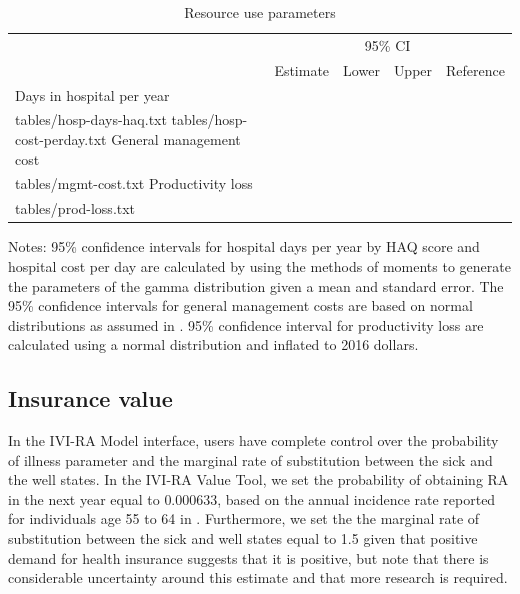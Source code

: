 \documentclass[11pt,final,fleqn]{article}
\makeatletter
\theoremstyle{plain}
\newcommand*\ExpandableInput[1]{\@@input#1 }
\makeatother
\begin{document}
\begin{table}[H]
\begin{center}
\begin{threeparttable}
\caption{Resource use parameters} \label{tbl:resource-use-pars}
\footnotesize
\begin{tabularx}{\textwidth}{@{\extracolsep{\fill}}lcccc}
\hline
\multicolumn{2}{l}{} & \multicolumn{2}{c}{95\% CI} & \multicolumn{1}{l}{} \\
\cmidrule{3-4} 
\multicolumn{1}{l}{} & \multicolumn{1}{l}{Estimate} & \multicolumn{1}{c}{Lower} & \multicolumn{1}{c}{Upper} & \multicolumn{1}{c}{Reference} \\
\hline
Days in hospital per year \\
\ExpandableInput{tables/hosp-days-haq.txt}
\ExpandableInput{tables/hosp-cost-perday.txt}
General management cost \\
\ExpandableInput{tables/mgmt-cost.txt}
Productivity loss \\
\ExpandableInput{tables/prod-loss.txt}
\hline
\end{tabularx}
\scriptsize
Notes: 95\% confidence intervals for hospital days per year by HAQ score and hospital cost per day are calculated by using the methods of moments to generate the parameters of the gamma distribution given a mean and standard error. The 95\% confidence intervals for general management costs are based on normal distributions as assumed in \citet{claxton2016economic}. 95\% confidence interval for productivity loss are calculated using a normal distribution and inflated to 2016 dollars. 
\end{threeparttable}
\end{center}
\end{table}

\subsection{Insurance value}
In the IVI-RA Model interface, users have complete control over the probability of illness parameter and the marginal rate of substitution between the sick and the well states. In the IVI-RA Value Tool, we set the probability of obtaining RA in the next year equal to $0.000633$, based on the annual incidence rate reported for individuals age 55 to 64 in \citet{myasoedova2010incidence}. Furthermore, we set the the marginal rate of substitution between the sick and well states equal to 1.5 given that positive demand for health insurance suggests that it is positive, but note that there is considerable uncertainty around this estimate and that more research is required.  
\end{document}
